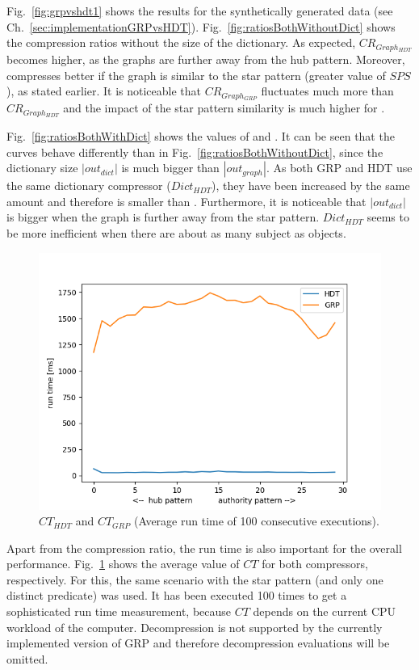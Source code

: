 Fig.~\ref{fig:grpvshdt1} shows the results for the synthetically generated data (see Ch.~\ref{sec:implementationGRPvsHDT}). Fig.~\ref{fig:ratiosBothWithoutDict} shows the compression ratios without the size of the dictionary. As expected, $CR_{Graph_{HDT}}$ becomes higher, as the graphs are further away from the hub pattern. Moreover, \GGRP{} compresses better if the graph is similar to the star pattern (greater value of $SPS$), as stated earlier. It is noticeable that $CR_{Graph_{GRP}}$ fluctuates much more than $CR_{Graph_{HDT}}$ and the impact of the star pattern similarity is much higher for \GGRP{}.


Fig.~\ref{fig:ratiosBothWithDict} shows the values of  and . It can be seen that the curves behave differently than in Fig.~\ref{fig:ratiosBothWithoutDict}, since the dictionary size $|out_{dict}|$ is much bigger than $|out_{graph}|$. As both GRP and HDT use the same dictionary compressor ($Dict_{HDT}$), they have been increased by the same amount and therefore  is smaller than . Furthermore, it is noticeable that $|out_{dict}|$ is bigger when the graph is further away from the star pattern. $Dict_{HDT}$ seems to be more inefficient when there are about as many subject as objects. 

\begin{figure}
	\centering
	\includegraphics[width=0.7\linewidth]{figures/GRPvsHDT/runtimes}
	\caption{$CT_{HDT}$ and $CT_{GRP}$ (Average run time of 100 consecutive executions).}
	\label{fig:runtimes}
\end{figure}

Apart from the compression ratio, the run time is also important for the overall performance. Fig.~\ref{fig:runtimes} shows the average value of $CT$ for both compressors, respectively. For this, the same scenario with the star pattern (and only one distinct predicate) was used. It has been executed 100 times to get a sophisticated run time measurement, because $CT$ depends on the current CPU workload of the computer. Decompression is not supported by the currently implemented version of GRP and therefore decompression evaluations will be omitted.

